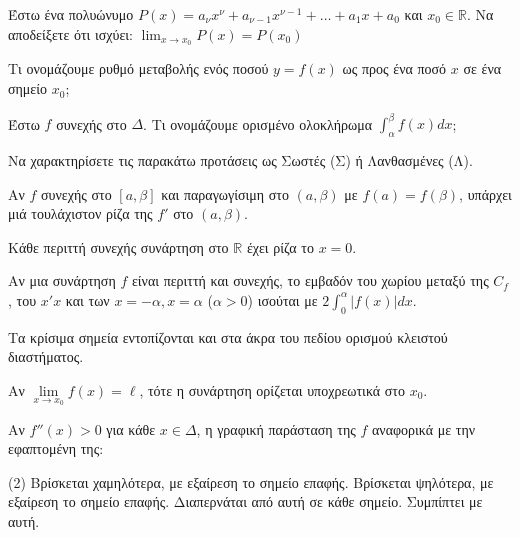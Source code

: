 \documentclass[11pt,a4paper]{article}
\newcommand{\kerkissans}[1]{{\fontfamily{maksf}\selectfont \textbf{#1}}}
\renewcommand{\textdexiakeraia}{}
\newcommand{\dint}{\displaystyle\int}
\newcommand\themanum{A}
\newcounter{thema}[section]
\renewcommand{\thethema}{\arabic{thema}}
\newcommand{\Thema}{\refstepcounter{thema}{\textbf{\textcolor{black}{\faPenSquare\ \  \large \kerkissans{\textbf{\thethemaο\hspace{2mm}Διαγώνισμα - Θέμα \themanum}}}}}\hspace{0mm}}{}
\newenvironment{thema}[1]
{\begin{tcolorbox}[title=\Thema\kerkissans{\textbf{\large{  #1}}},breakable,
enhanced standard,titlerule=0pt,toprule=0pt, rightrule=0pt, bottomrule=0pt,
colback=white,left=0mm,top=1mm,bottom=0mm,
boxrule=0pt,
colframe=white,leftrule=0mm,sharp corners,coltitle=black]
\renewcommand{\themanum}{#1}}
{\end{tcolorbox}}
\begin{document}
\begin{thema}{A}
\begin{erwthma}
    \item Έστω ένα πολυώνυμο $P(x) = a_\nu x^\nu + a_{\nu-1} x^{\nu-1} + \ldots + a_1 x + a_0$ και $ x_0 \in \mathbb{R} $. Να αποδείξετε ότι ισχύει: $ \lim_{x\to x_0} P(x) = P(x_0) $
    \item Τι ονομάζουμε ρυθμό μεταβολής ενός ποσού $y=f(x)$ ως προς ένα ποσό $x$ σε ένα σημείο $x_0$;
    \item Έστω $f$ συνεχής στο $\Delta$. Τι ονομάζουμε ορισμένο ολοκλήρωμα $\int_\alpha^\beta f(x) dx$;
    \item Να χαρακτηρίσετε τις παρακάτω προτάσεις ως Σωστές (Σ) ή Λανθασμένες (Λ).
    \begin{alist}
        \item Αν $f$ συνεχής στο $[a, \beta]$ και παραγωγίσιμη στο $(a, \beta)$ με $f(a)=f(\beta)$, υπάρχει μιά τουλάχιστον ρίζα της $f'$ στο $(a, \beta)$.
        \item Κάθε περιττή συνεχής συνάρτηση στο $\mathbb{R}$ έχει ρίζα το $x=0$.
        \item Αν μια συνάρτηση $f$ είναι περιττή και συνεχής, το εμβαδόν του χωρίου μεταξύ της $C_f$, του $x'x$ και των $x=-\alpha, x=\alpha$ ($\alpha>0$) ισούται με $2\dint_0^\alpha |f(x)| dx$.
        \item Τα κρίσιμα σημεία εντοπίζονται και στα άκρα του πεδίου ορισμού κλειστού διαστήματος.
        \item Αν $\lim\limits_{x\to x_0} f(x) = \ell$, τότε η συνάρτηση ορίζεται υποχρεωτικά στο $x_0$.
    \end{alist}
    \item Αν $f''(x) > 0$ για κάθε $x \in \Delta$, η γραφική παράσταση της $f$ αναφορικά με την εφαπτομένη της:
    \begin{tasks}[label=\let\textdexiakeraia\relax\alph*.](2)
        \task Βρίσκεται χαμηλότερα, με εξαίρεση το σημείο επαφής.
        \task Βρίσκεται ψηλότερα, με εξαίρεση το σημείο επαφής.
        \task Διαπερνάται από αυτή σε κάθε σημείο.
        \task Συμπίπτει με αυτή.
    \end{tasks}
\end{erwthma}
\end{thema}
\vspace{1cm}
\end{document}

